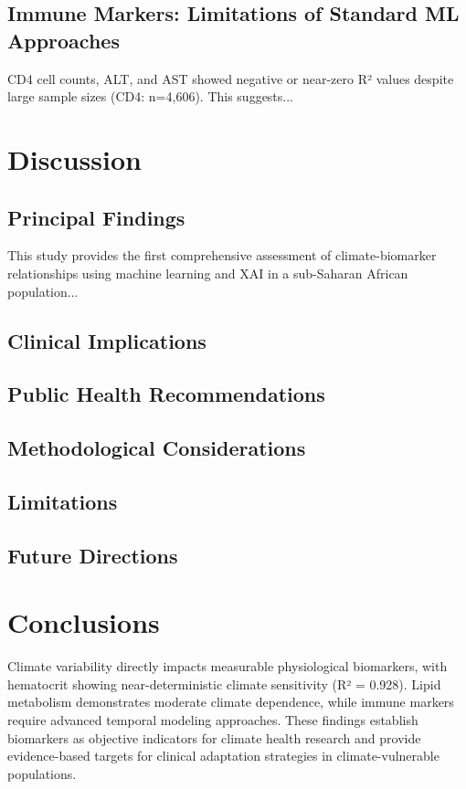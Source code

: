 \documentclass[11pt,a4paper]{article}
\begin{document}
\subsection{Immune Markers: Limitations of Standard ML Approaches}

CD4 cell counts, ALT, and AST showed negative or near-zero R² values despite large sample sizes (CD4: n=4,606). This suggests...

\section{Discussion}

\subsection{Principal Findings}

This study provides the first comprehensive assessment of climate-biomarker relationships using machine learning and XAI in a sub-Saharan African population...


\subsection{Clinical Implications}

\subsection{Public Health Recommendations}

\subsection{Methodological Considerations}

\subsection{Limitations}

\subsection{Future Directions}

\section{Conclusions}

Climate variability directly impacts measurable physiological biomarkers, with hematocrit showing near-deterministic climate sensitivity (R² = 0.928). Lipid metabolism demonstrates moderate climate dependence, while immune markers require advanced temporal modeling approaches. These findings establish biomarkers as objective indicators for climate health research and provide evidence-based targets for clinical adaptation strategies in climate-vulnerable populations.
\end{document}
